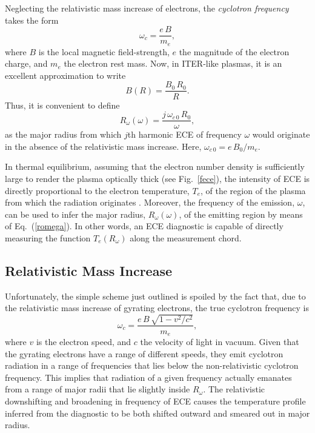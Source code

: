 \documentclass{iopjournal}
\begin{document}
Neglecting the relativistic mass increase of electrons, the {\em cyclotron frequency}\/ takes the form \cite{plasma}
\begin{equation}
\omega_c = \frac{e\,B}{m_e},
\end{equation}
where $B$ is the local magnetic field-strength, $e$ the magnitude of the electron charge, and $m_e$ the electron rest mass.
Now, in ITER-like plasmas, it is an excellent approximation to write
\begin{equation}
B(R)= \frac{B_0\,R_0}{R}.
\end{equation}
Thus, it is convenient to define
\begin{equation}\label{romega}
R_\omega(\omega) = \frac{j\,\omega_{c\,0}\,R_0}{\omega},
\end{equation}
as the major radius from which $j$th harmonic ECE of frequency $\omega$ would originate in the absence of the relativistic mass increase. Here, $\omega_{c\,0}=e\,B_0/m_e$. 

In thermal equilibrium, assuming that the electron number density is sufficiently large to render the plasma optically thick (see Fig.~\ref{fece}), the intensity of ECE  is directly proportional to the electron temperature, $T_e$,  of the region of the plasma from which the radiation originates \cite{bornatici}. 
 Moreover, the frequency of the emission, $\omega$, can be used to infer the major radius, $R_\omega(\omega)$,  of the
emitting region by means of Eq.~(\ref{romega}). In other words, an ECE diagnostic is capable of directly measuring the function $T_e(R_\omega)$ along the measurement chord.

\subsection{Relativistic Mass Increase}
 Unfortunately, the simple scheme just outlined is spoiled by the
fact that, due to the relativistic mass increase of gyrating electrons,  the true cyclotron frequency is
\begin{equation}
\omega_c = \frac{e\,B\,\sqrt{1-v^2/c^2}}{m_e},
\end{equation}
where $v$ is the electron speed, and $c$ the velocity of light in vacuum. Given that the gyrating electrons have a range of different speeds, they emit
cyclotron radiation in a range of frequencies that lies below the non-relativistic cyclotron frequency. This implies that radiation of a given frequency
actually emanates from a range of major radii that lie slightly inside $R_\omega$. The relativistic downshifting and broadening
in frequency of ECE  causes the temperature profile inferred from the diagnostic to be both shifted outward and smeared out in major radius. 
\end{document}
